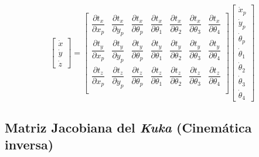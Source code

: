 \begin{equation*}
    \begin{bmatrix}
        \dot{x} \\
        \dot{y} \\
        \dot{z}
    \end{bmatrix} =
    \begin{bmatrix}
        \dfrac{\partial t_x}{\partial x_p} & \dfrac{\partial t_x}{\partial y_p} & \dfrac{\partial t_x}{\partial \theta_p} & \dfrac{\partial t_x}{\partial \theta_1} & \dfrac{\partial t_x}{\partial \theta_2} & \dfrac{\partial t_x}{\partial \theta_3} & \dfrac{\partial t_x}{\partial \theta_4} \\
        \dfrac{\partial t_y}{\partial x_p} & \dfrac{\partial t_y}{\partial y_p} & \dfrac{\partial t_y}{\partial \theta_p} & \dfrac{\partial t_y}{\partial \theta_1} & \dfrac{\partial t_y}{\partial \theta_2} & \dfrac{\partial t_y}{\partial \theta_3} & \dfrac{\partial t_y}{\partial \theta_4} \\
        \dfrac{\partial t_z}{\partial x_p} & \dfrac{\partial t_z}{\partial y_p} & \dfrac{\partial t_z}{\partial \theta_p} & \dfrac{\partial t_z}{\partial \theta_1} & \dfrac{\partial t_z}{\partial \theta_2} & \dfrac{\partial t_z}{\partial \theta_3} & \dfrac{\partial t_z}{\partial \theta_4} \\
    \end{bmatrix}
    \begin{bmatrix}
        \dot{x}_p \\
        \dot{y}_p \\
        \dot{\theta}_p \\
        \dot{\theta}_1 \\
        \dot{\theta}_2 \\
        \dot{\theta}_3 \\
        \dot{\theta}_4
    \end{bmatrix}
\end{equation*}

\subsection{Matriz Jacobiana del \emph{Kuka} (Cinemática inversa)}


